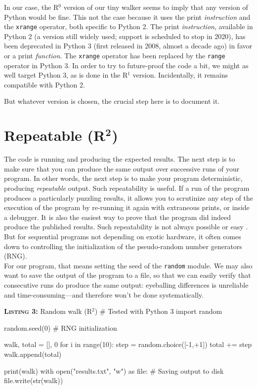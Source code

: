 \documentclass[a4paper,11pt]{article}
\begin{document}
In our case, the R$^0$ version of our tiny walker seems to imply
that any version of Python would be fine.
This not the case because it uses the print {\em instruction} and the {\tt xrange} operator, both specific to Python 2.
The print {\em instruction}, available in Python 2 (a version still widely used; support is scheduled to stop in 2020), 
has been deprecated in Python 3 (first released in 2008, almost a decade ago)
in favor or a  print {\em function}.
The {\tt xrange} operator has been replaced by the {\tt range} operator in Python 3.
In order to try to future-proof the code a bit, we might as well target Python 3, as is done in the R$^1$ version.
Incidentally, it remains compatible with Python 2.

But whatever version is chosen,
the crucial step here is to document it.


\section*{Repeatable (R$^{\mathbf 2}$)}

The code is running and producing the expected results. 
The next step is to make sure that you can produce the same output over successive runs of your program. 
In other words, the next step is to make your program deterministic,  producing {\em repeatable} output. 
Such repeatability is useful. 
If a run of the program produces a particularly puzzling results,  it allows you to scrutinize any step of the execution of the program by re-running it again with extraneous prints, or inside a debugger. 
It is also the easiest way to prove that the program did indeed produce the published results.
Such repeatability is not always possible or easy \citep{Diethelm:2012, Courtes:2015}.
But for sequential programs not depending on exotic hardware, it often comes down to controlling the initialization of the pseudo-random number generators (RNG).\\ 

For our program, that means setting the seed of the {\tt random} module. We may also want to save the output of the program to a file, so that we can easily verify that consecutive runs do produce the same output: eyeballing differences is unreliable and  time-consuming---and therefore won't be done systematically.

\begin{code}{\textbf{\textsc{Listing 3:}} Random walk (R$^2$)}
# Tested with Python 3
import random

random.seed(0) # RNG initialization

walk, total = [], 0
for i in range(10):
    step = random.choice([-1,+1])     
    total += step
    walk.append(total)
    
print(walk)
with open("results.txt", "w") as file: # Saving output to disk
    file.write(str(walk))
\end{code}
\end{document}
